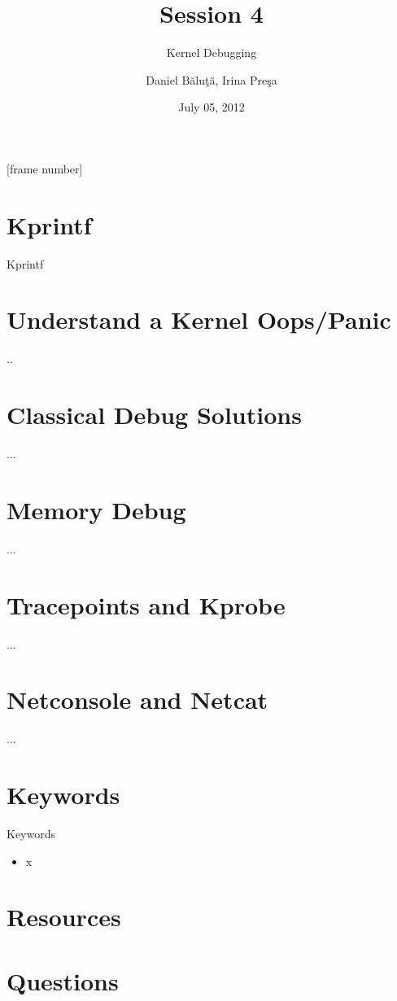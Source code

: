 \documentclass{workshop}
\title[Session 4]{Session 4}
\subtitle{Kernel Debugging}
\author{Daniel Băluţă, Irina Preşa}
\date{July 05, 2012}
\begin{document}
[frame number]

\frame{\titlepage}

\section{Kprintf}
\begin{frame}{Kprintf}
\end{frame}

\section{Understand a Kernel Oops/Panic}
\begin{frame}{..}
\end{frame}

\section{Classical Debug Solutions}
\begin{frame}{...}
\end{frame}

\section{Memory Debug}
\begin{frame}{...}
\end{frame}

\section{Tracepoints and Kprobe}
\begin{frame}{...}
\end{frame}

\section{Netconsole and Netcat}
\begin{frame}{...}
\end{frame}

\section{Keywords}
\begin{frame}{Keywords}
      \begin{itemize}
        \item x
      \end{itemize}
\end{frame}

\section{Resources}

\section{Questions}
\end{document}

